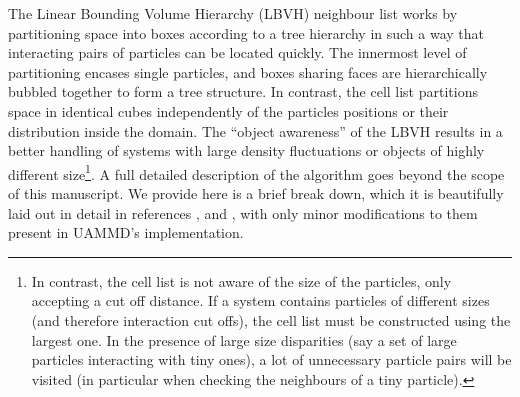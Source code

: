 \documentclass[ twoside,openright,titlepage,numbers=noenddot,%
headinclude,footinclude,cleardoublepage=empty,abstract=on,
BCOR=5mm,paper=b5,fontsize=11pt, dvipsnames
]{scrreprt}
\begin{document}
The Linear Bounding Volume Hierarchy (LBVH) neighbour list works by partitioning space into boxes according to a tree hierarchy in such a way that interacting pairs of particles can be located quickly. The innermost level of partitioning encases single particles, and boxes sharing faces are hierarchically bubbled together to form a tree structure. In contrast, the cell list partitions space in identical cubes independently of the particles positions or their distribution inside the domain. The ``object awareness'' of the LBVH results in a better handling of systems with large density fluctuations or objects of highly different size\footnote{In contrast, the cell list is not aware of the size of the particles, only accepting a cut off distance. If a system contains particles of different sizes (and therefore interaction cut offs), the cell list must be constructed using the largest one. In the presence of large size disparities (say a set of large particles interacting with tiny ones), a lot of unnecessary particle pairs will be visited (in particular when checking the neighbours of a tiny particle).}.
A full detailed description of the algorithm goes beyond the scope of this manuscript. We provide here is a brief break down, which it is beautifully laid out in detail in references \cite{Howard2016}, \cite{Howard2019} and \cite{Torres2009}, with only minor modifications to them present in UAMMD's implementation.
\end{document}
